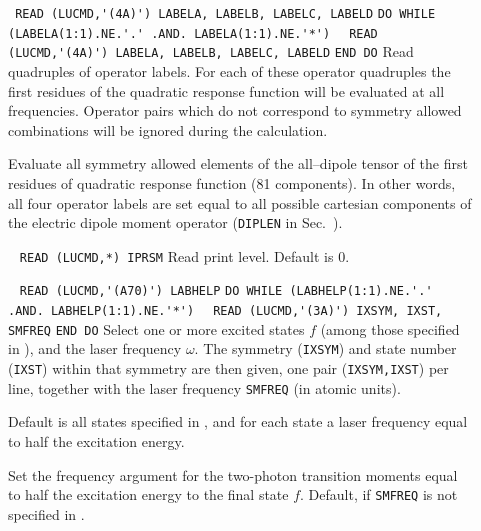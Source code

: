 \begin{description}
\item[] \verb| |\newline
\verb|READ (LUCMD,'(4A)') LABELA, LABELB, LABELC, LABELD|\newline
\verb|DO WHILE (LABELA(1:1).NE.'.' .AND. LABELA(1:1).NE.'*')|\newline
\verb|  READ (LUCMD,'(4A)') LABELA, LABELB, LABELC, LABELD|\newline
\verb|END DO|\newline
Read quadruples of operator labels.
For each of these operator quadruples the first residues of the quadratic response
function will be evaluated at all frequencies.
Operator pairs which do not correspond to symmetry allowed
combinations will be ignored during the calculation.
%
\item[] 
Evaluate all symmetry allowed elements of the all--dipole tensor
of the first residues of quadratic response function
(81 components). In other words, all four operator labels 
are set equal to all possible cartesian components of 
the electric dipole moment operator (\verb+DIPLEN+ in Sec.~).
%
\item[] \verb| |\newline
\verb|READ (LUCMD,*) IPRSM|\newline
Read print level. Default is 0.
%
\item[] \verb| | \newline
\verb|READ (LUCMD,'(A70)') LABHELP|\newline
\verb|DO WHILE (LABHELP(1:1).NE.'.' .AND. LABHELP(1:1).NE.'*')|\newline
\verb|  READ (LUCMD,'(3A)') IXSYM, IXST, SMFREQ|\newline
\verb|END DO| \newline
Select one or more excited states $f$ (among those specified
in ), and the laser frequency $\omega$.
The symmetry (\verb+IXSYM+) and state number (\verb+IXST+)
within that symmetry are then given,
one pair (\verb|IXSYM,IXST|) per line, together with the
laser frequency \verb+SMFREQ+ (in atomic units).

Default is all states specified in , and for each state 
a laser frequency equal to half the excitation energy.

%
\item[] 
Set the frequency argument for the two-photon transition moments
equal to  half the excitation energy to the final state $f$. Default,
if \verb+SMFREQ+ is not specified in .
%
\end{description}
